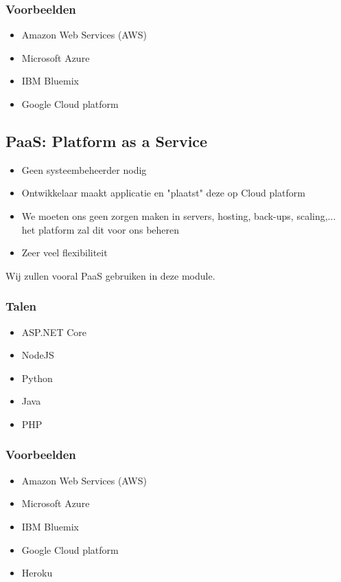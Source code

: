 \documentclass{article}
\begin{document}
\subsubsection{Voorbeelden}
\begin{itemize}
    \item Amazon Web Services (AWS)
    \item Microsoft Azure
    \item IBM Bluemix
    \item Google Cloud platform
\end{itemize}

\subsection{PaaS: Platform as a Service}

\begin{itemize}
    \item Geen systeembeheerder nodig
    \item Ontwikkelaar maakt applicatie en "plaatst" deze op Cloud platform
    \item We moeten ons geen zorgen maken in servers, hosting, back-ups, scaling,... het platform zal dit voor ons beheren
    \item Zeer veel flexibiliteit
\end{itemize}

Wij zullen vooral PaaS gebruiken in deze module.

\subsubsection{Talen}
\begin{itemize}
    \item ASP.NET Core
    \item NodeJS
    \item Python
    \item Java
    \item PHP
\end{itemize}

\subsubsection{Voorbeelden}
\begin{itemize}
    \item Amazon Web Services (AWS)
    \item Microsoft Azure
    \item IBM Bluemix
    \item Google Cloud platform
    \item Heroku
\end{itemize}
\end{document}
